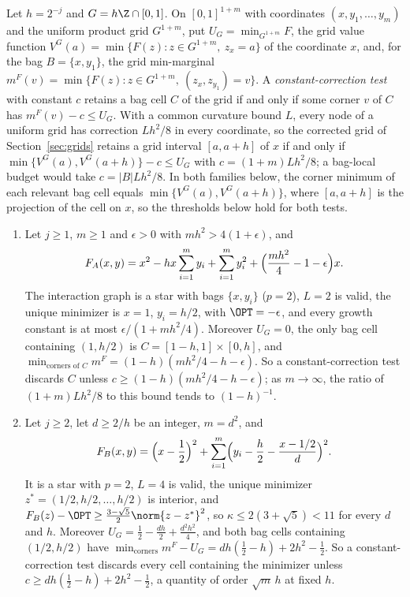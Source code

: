 Let $h=2^{-j}$ and $G=h\Z\cap[0,1]$. On $[0,1]^{1+m}$ with coordinates
$(x,y_1,\ldots,y_m)$ and the uniform product grid $G^{1+m}$, put
$U_G=\min_{G^{1+m}}F$, the grid value function
$V^G(a)=\min\{F(z):z\in G^{1+m},\ z_x=a\}$ of the coordinate $x$, and, for the
bag $B=\{x,y_1\}$, the grid min-marginal
$m^F(v)=\min\{F(z):z\in G^{1+m},\ (z_x,z_{y_1})=v\}$. A
\emph{constant-correction test} with constant $c$ retains a bag cell $C$ of
the grid if and only if some corner $v$ of $C$ has $m^F(v)-c\le U_G$. With a
common curvature bound $L$, every node of a uniform grid has correction
$Lh^2/8$ in every coordinate, so the corrected grid of
Section~\ref{sec:grids} retains a grid interval $[a,a+h]$ of $x$ if and only
if $\min\{V^G(a),V^G(a+h)\}-c\le U_G$ with $c=(1+m)Lh^2/8$; a bag-local
budget would take $c=|B|Lh^2/8$. In both families below, the corner minimum
of each relevant bag cell equals $\min\{V^G(a),V^G(a+h)\}$, where $[a,a+h]$
is the projection of the cell on $x$, so the thresholds below hold for both
tests.

\begin{proposition}\label{prop:star}
\leavevmode
\begin{enumerate}
\item[(A)] Let $j\ge1$, $m\ge1$ and $\epsilon>0$ with $mh^2>4(1+\epsilon)$,
and
\[
F_A(x,y)=x^2-hx\sum_{i=1}^my_i+\sum_{i=1}^my_i^2
+\Bigl(\frac{mh^2}4-1-\epsilon\Bigr)x .
\]
The interaction graph is a star with bags $\{x,y_i\}$ ($p=2$), $L=2$ is
valid, the unique minimizer is $x=1$, $y_i=h/2$, with $\OPT=-\epsilon$, and
every growth constant is at most $\epsilon/(1+mh^2/4)$. Moreover $U_G=0$,
the only bag cell containing $(1,h/2)$ is $C=[1-h,1]\times[0,h]$, and
$\min_{\text{corners of }C}m^F=(1-h)(mh^2/4-h-\epsilon)$. So a
constant-correction test discards $C$ unless
$c\ge(1-h)(mh^2/4-h-\epsilon)$; as $m\to\infty$, the ratio of
$(1+m)Lh^2/8$ to this bound tends to $(1-h)^{-1}$.
\item[(B)] Let $j\ge2$, let $d\ge2/h$ be an integer, $m=d^2$, and
\[
F_B(x,y)=\Bigl(x-\frac12\Bigr)^2+\sum_{i=1}^m
\Bigl(y_i-\frac h2-\frac{x-1/2}{d}\Bigr)^2 .
\]
It is a star with $p=2$, $L=4$ is valid, the unique minimizer
$z^*=(1/2,h/2,\ldots,h/2)$ is interior, and
$F_B(z)-\OPT\ge\frac{3-\sqrt5}2\norm{z-z^*}^2$, so $\kappa\le2(3+\sqrt5)<11$
for every $d$ and $h$. Moreover $U_G=\frac12-\frac{dh}2+\frac{d^2h^2}4$, and
both bag cells containing $(1/2,h/2)$ have
$\min_{\text{corners}}m^F-U_G=dh(\frac12-h)+2h^2-\frac12$. So a
constant-correction test discards every cell containing the minimizer
unless $c\ge dh(\frac12-h)+2h^2-\frac12$, a quantity of order $\sqrt m\,h$
at fixed $h$.
\end{enumerate}
\end{proposition}


